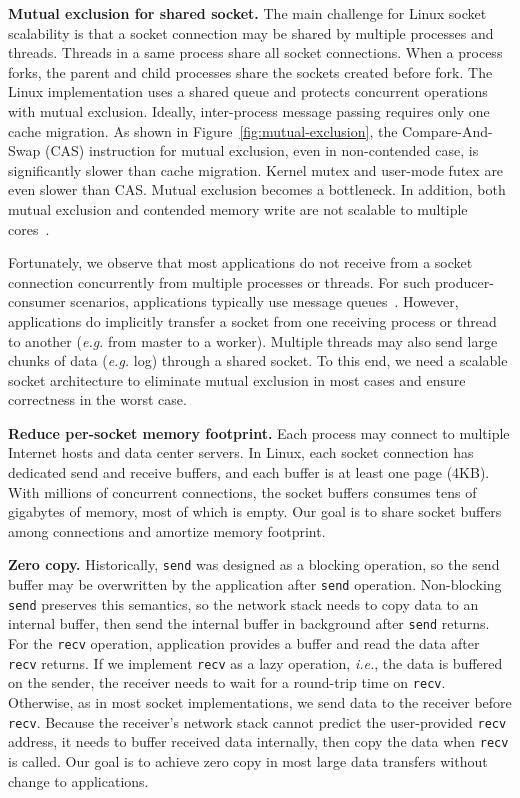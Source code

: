 \textbf{Mutual exclusion for shared socket.}
The main challenge for Linux socket scalability is that a socket connection may be shared by multiple processes and threads. Threads in a same process share all socket connections. When a process forks, the parent and child processes share the sockets created before fork. The Linux implementation uses a shared queue and protects concurrent operations with mutual exclusion.
Ideally, inter-process message passing requires only one cache migration. As shown in Figure~\ref{fig:mutual-exclusion}, the Compare-And-Swap (CAS) instruction for mutual exclusion, even in non-contended case, is significantly slower than cache migration. Kernel mutex and user-mode futex are even slower than CAS. Mutual exclusion becomes a bottleneck. In addition, both mutual exclusion and contended memory write are not scalable to multiple cores~\cite{boyd2014optimizing}.

Fortunately, we observe that most applications do not receive from a socket connection concurrently from multiple processes or threads. For such producer-consumer scenarios, applications typically use message queues~\cite{hintjens2013zeromq}. However, applications do implicitly transfer a socket from one receiving process or thread to another (\textit{e.g.} from master to a worker). Multiple threads may also send large chunks of data (\textit{e.g.} log) through a shared socket.
To this end, we need a scalable socket architecture to eliminate mutual exclusion in most cases and ensure correctness in the worst case.


\textbf{Reduce per-socket memory footprint.}
Each process may connect to multiple Internet hosts and data center servers. In Linux, each socket connection has dedicated send and receive buffers, and each buffer is at least one page (4KB). With millions of concurrent connections, the socket buffers consumes tens of gigabytes of memory, most of which is empty. Our goal is to share socket buffers among connections and amortize memory footprint.


\textbf{Zero copy.}
Historically, \texttt{send} was designed as a blocking operation, so the send buffer may be overwritten by the application after \texttt{send} operation.
Non-blocking \texttt{send} preserves this semantics, so the network stack needs to copy data to an internal buffer, then send the internal buffer in background after \texttt{send} returns.
For the \texttt{recv} operation, application provides a buffer and read the data after \texttt{recv} returns.
If we implement \texttt{recv} as a lazy operation, \textit{i.e.}, the data is buffered on the sender, the receiver needs to wait for a round-trip time on \texttt{recv}.
Otherwise, as in most socket implementations, we send data to the receiver before \texttt{recv}. Because the receiver's network stack cannot predict the user-provided \texttt{recv} address, it needs to buffer received data internally, then copy the data when \texttt{recv} is called.
Our goal is to achieve zero copy in most large data transfers without change to applications.

